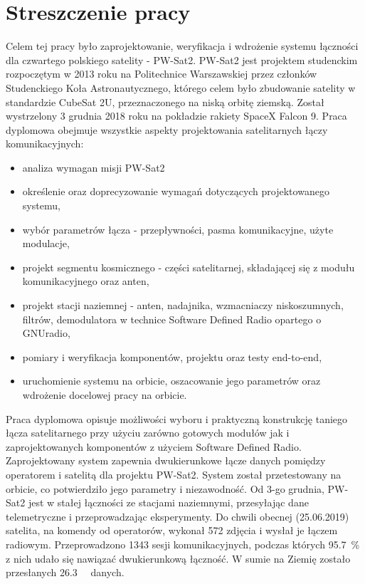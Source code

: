 \chapter{Streszczenie pracy}

Celem tej pracy było zaprojektowanie, weryfikacja i wdrożenie systemu łączności dla czwartego polskiego satelity - PW-Sat2. PW-Sat2 jest projektem studenckim  rozpoczętym w 2013 roku na Politechnice Warszawskiej przez członków Studenckiego Koła Astronautycznego, którego celem było zbudowanie satelity w standardzie CubeSat 2U, przeznaczonego na niską orbitę ziemską. Został wystrzelony 3 grudnia 2018 roku na pokładzie rakiety SpaceX Falcon 9.
Praca dyplomowa obejmuje wszystkie aspekty projektowania satelitarnych łączy komunikacyjnych:
\begin{itemize}
    \setlength\itemsep{0em}
    \item analiza wymagan misji PW-Sat2
    \item określenie oraz doprecyzowanie wymagań dotyczących projektowanego systemu,
    \item wybór parametrów łącza - przepływności, pasma komunikacyjne, użyte modulacje,
    \item projekt segmentu kosmicznego - części satelitarnej, składającej się z modułu komunikacyjnego oraz anten,
    \item projekt stacji naziemnej - anten, nadajnika, wzmacniaczy niskoszumnych, filtrów, demodulatora w technice Software Defined Radio opartego o GNUradio,
    \item pomiary i weryfikacja komponentów, projektu oraz testy end-to-end,
    \item uruchomienie systemu na orbicie, oszacowanie jego parametrów oraz wdrożenie docelowej pracy na orbicie.
\end{itemize}
Praca dyplomowa opisuje możliwości wyboru i praktyczną konstrukcję taniego łącza satelitarnego przy użyciu zarówno gotowych modułów jak i zaprojektowanych komponentów z użyciem Software Defined Radio. Zaprojektowany system zapewnia dwukierunkowe łącze danych pomiędzy operatorem i satelitą dla projektu PW-Sat2. System został przetestowany na orbicie, co potwierdziło jego parametry i niezawodność. Od 3-go grudnia, PW-Sat2 jest w stałej łączności ze stacjami naziemnymi, przesyłając dane telemetryczne i przeprowadzając eksperymenty. Do chwili obecnej (25.06.2019) satelita, na komendy od operatorów, wykonał \si{572} zdjęcia i wysłał je łączem radiowym. Przeprowadzono \si{1343} sesji komunikacyjnych, podczas których \SI{95.7}{\percent} z nich udało się nawiązać dwukierunkową łączność. W sumie na Ziemię zostało przesłanych \SI{26.3}{\mega\byte} danych.
